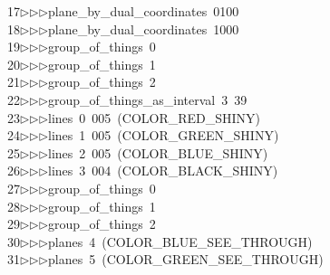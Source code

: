 \begin{tabbing}
17\>$\triangleright$\>$\triangleright$\>$\triangleright$\>plane\_by\_dual\_coordinates\ 0100\ \\[0pt]
18\>$\triangleright$\>$\triangleright$\>$\triangleright$\>plane\_by\_dual\_coordinates\ 1000\ \\[0pt]
19\>$\triangleright$\>$\triangleright$\>$\triangleright$\>group\_of\_things\ 0\ \\[0pt]
20\>$\triangleright$\>$\triangleright$\>$\triangleright$\>group\_of\_things\ 1\ \\[0pt]
21\>$\triangleright$\>$\triangleright$\>$\triangleright$\>group\_of\_things\ 2\ \\[0pt]
22\>$\triangleright$\>$\triangleright$\>$\triangleright$\>group\_of\_things\_as\_interval\ 3\ 39\ \\[0pt]
23\>$\triangleright$\>$\triangleright$\>$\triangleright$\>lines\ 0\ 005\ (COLOR\_RED\_SHINY)\ \\[0pt]
24\>$\triangleright$\>$\triangleright$\>$\triangleright$\>lines\ 1\ 005\ (COLOR\_GREEN\_SHINY)\ \\[0pt]
25\>$\triangleright$\>$\triangleright$\>$\triangleright$\>lines\ 2\ 005\ (COLOR\_BLUE\_SHINY)\ \\[0pt]
26\>$\triangleright$\>$\triangleright$\>$\triangleright$\>lines\ 3\ 004\ (COLOR\_BLACK\_SHINY)\ \\[0pt]
27\>$\triangleright$\>$\triangleright$\>$\triangleright$\>group\_of\_things\ 0\ \\[0pt]
28\>$\triangleright$\>$\triangleright$\>$\triangleright$\>group\_of\_things\ 1\ \\[0pt]
29\>$\triangleright$\>$\triangleright$\>$\triangleright$\>group\_of\_things\ 2\ \\[0pt]
30\>$\triangleright$\>$\triangleright$\>$\triangleright$\>planes\ 4\ (COLOR\_BLUE\_SEE\_THROUGH)\ \\[0pt]
31\>$\triangleright$\>$\triangleright$\>$\triangleright$\>planes\ 5\ (COLOR\_GREEN\_SEE\_THROUGH)\ \\[0pt]

\end{tabbing}
